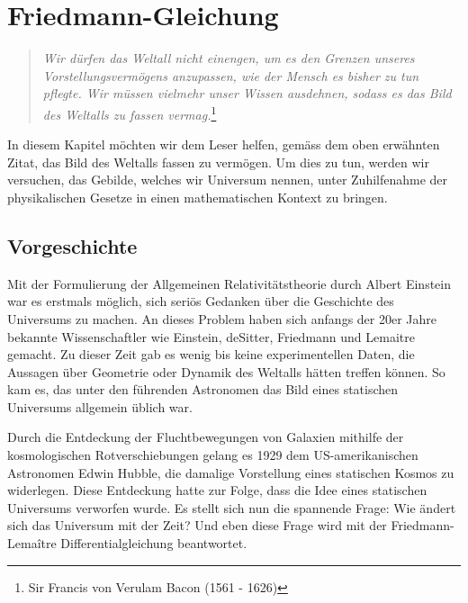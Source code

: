 \chapter{Friedmann-Gleichung\label{chapter:friedmann}}
\begin{refsection}
\rhead{}
\begin{quote}
	\textit{Wir dürfen das Weltall nicht einengen, um es den Grenzen unseres Vorstellungsvermögens anzupassen, wie der Mensch es bisher zu tun pflegte. Wir müssen vielmehr unser Wissen ausdehnen, sodass es das Bild des Weltalls zu fassen vermag.}\footnote{Sir Francis von Verulam Bacon (1561 - 1626)}
\end{quote}
In diesem Kapitel möchten wir dem Leser helfen, gemäss dem oben erwähnten Zitat, das Bild des Weltalls fassen zu vermögen. Um dies zu tun, werden wir versuchen, das Gebilde, welches wir Universum nennen, unter Zuhilfenahme der physikalischen Gesetze in einen mathematischen Kontext zu bringen.

\section{Vorgeschichte}
Mit der Formulierung der Allgemeinen Relativitätstheorie durch Albert Einstein war es erstmals möglich,
sich seriös Gedanken über die Geschichte des
Universums zu machen. An dieses Problem haben sich anfangs der 20er Jahre bekannte Wissenschaftler wie Einstein, deSitter, Friedmann und Lemaitre gemacht. 
Zu dieser Zeit gab es wenig bis keine experimentellen Daten, die Aussagen über Geometrie oder Dynamik des Weltalls hätten treffen können. So kam es, das unter den führenden Astronomen das Bild eines statischen Universums allgemein üblich war.

Durch die Entdeckung der Fluchtbewegungen von Galaxien mithilfe der kosmologischen Rotverschiebungen gelang es 1929 dem US-amerikanischen Astronomen Edwin Hubble, die damalige Vorstellung eines statischen Kosmos zu widerlegen. Diese Entdeckung hatte zur Folge, dass die Idee eines statischen Universums verworfen wurde. Es stellt sich nun die spannende Frage: Wie ändert sich das Universum mit der Zeit? Und eben diese Frage wird mit der Friedmann-Lema\^{i}tre Differentialgleichung beantwortet.
\pagebreak


\end{refsection}
